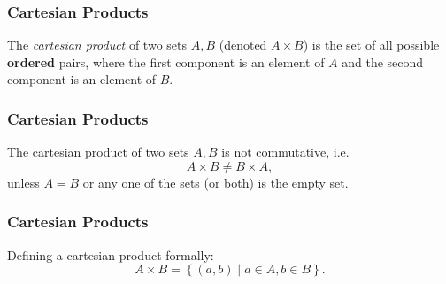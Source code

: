 \begin{frame}
  \frametitle{Cartesian Products}
  \begin{presentation_definition}
    The \emph{cartesian product} of two sets $A,B$ (denoted $A\times B$) is the set of all possible \textbf{ordered} pairs, where the first component is an element of $A$ and the second component is an element of $B$.
  \end{presentation_definition}
\end{frame}

\begin{frame}
  \frametitle{Cartesian Products}
  \begin{presentation_note}
    The cartesian product of two sets $A,B$ is not commutative, i.e.
    \begin{equation*}
      A\times B \neq B\times A,
    \end{equation*}
    unless $A=B$ or any one of the sets (or both) is the empty set.
  \end{presentation_note}
\end{frame}

\begin{frame}
  \frametitle{Cartesian Products}
  Defining a cartesian product formally:
  \begin{equation*}
    A \times B = \left\{ (a,b) \mid a\in A,b\in B \right\}.
  \end{equation*}


\end{frame}

